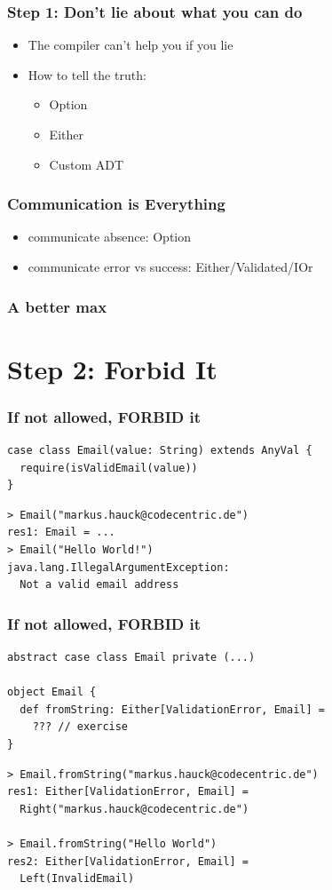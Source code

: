 \documentclass{beamer}
\begin{document}
\begin{frame}
  \frametitle{Step 1: Don't lie about what you can do}
  \begin{itemize}
  \item The compiler can't help you if you lie
  \item How to tell the truth:
    \begin{itemize}
    \item Option
    \item Either
    \item Custom ADT
    \end{itemize}
  \end{itemize}
\end{frame}

\begin{frame}
  \frametitle{Communication is Everything}
  \begin{itemize}
  \item communicate absence: Option
  \item communicate error vs success: Either/Validated/IOr
  \end{itemize}
\end{frame}

\begin{frame}
  \frametitle{A better max}
  
\end{frame}

\section{Step 2: Forbid It}

\begin{frame}[fragile]
  \frametitle{If not allowed, FORBID it}
\begin{verbatim}
case class Email(value: String) extends AnyVal {
  require(isValidEmail(value))
}
\end{verbatim}
\begin{verbatim}
> Email("markus.hauck@codecentric.de")
res1: Email = ...
> Email("Hello World!")
java.lang.IllegalArgumentException: 
  Not a valid email address                      
\end{verbatim}
\end{frame}

\begin{frame}
  \frametitle{If not allowed, FORBID it}
\begin{verbatim}
abstract case class Email private (...)

object Email {
  def fromString: Either[ValidationError, Email] = 
    ??? // exercise
}
\end{verbatim}

\begin{verbatim}
> Email.fromString("markus.hauck@codecentric.de")
res1: Either[ValidationError, Email] = 
  Right("markus.hauck@codecentric.de")

> Email.fromString("Hello World")
res2: Either[ValidationError, Email] = 
  Left(InvalidEmail)
\end{verbatim}
\end{frame}
\end{document}
